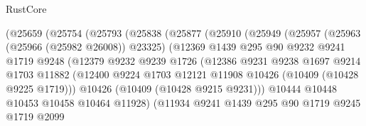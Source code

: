 \begin{lexlean}{RustCore}
\begin{coremodule}
                        (@25659
                          (@25754
                            (@25793
                              (@25838
                                (@25877
                                  (@25910
                                    (@25949
                                      (@25957
                                        (@25963 (@25966 (@25982 @26008)) @23325)
                                        (@12369
                                          @1439
                                          @295
                                          @90
                                          @9232
                                          @9241
                                          @1719
                                          @9248
                                          (@12379
                                            @9232
                                            @9239
                                            @1726
                                            (@12386
                                              @9231
                                              @9238
                                              @1697
                                              @9214
                                              @1703
                                              @11882
                                              (@12400
                                                @9224
                                                @1703
                                                @12121
                                                @11908
                                                @10426
                                                (@10409 (@10428 @9225 @1719)))
                                              @10426
                                              (@10409 (@10428 @9215 @9231)))
                                            @10444
                                            @10448
                                            @10453
                                            @10458
                                            @10464
                                            @11928)
                                          (@11934
                                            @9241
                                            @1439
                                            @295
                                            @90
                                            @1719
                                            @9245
                                            @1719
                                            @2099

\end{coremodule}
\end{lexlean}
